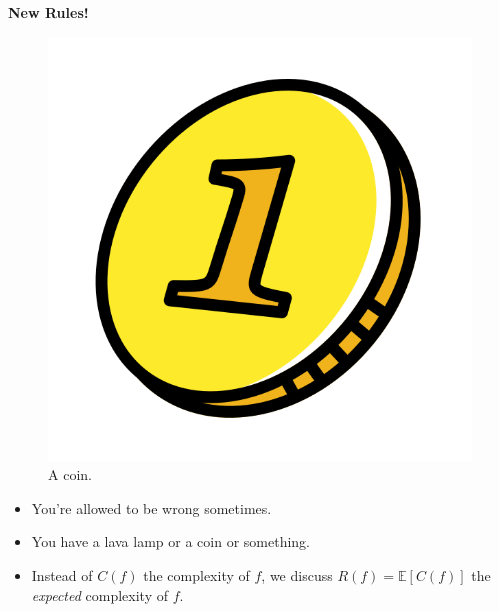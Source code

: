 \begin{center}\textbf{New Rules!}\end{center}

\begin{figure}
  \includegraphics[width=0.3\linewidth]{coin.png}
  \caption{A coin.}
\end{figure}

\begin{itemize}
	\item You're allowed to be wrong sometimes.
	\item You have a lava lamp or a coin or something.
	\item Instead of $C(f)$ the complexity of $f$,
	we discuss $R(f) = \mathbb{E}[C(f)]$ the \emph{expected}
	complexity of $f$.
\end{itemize}